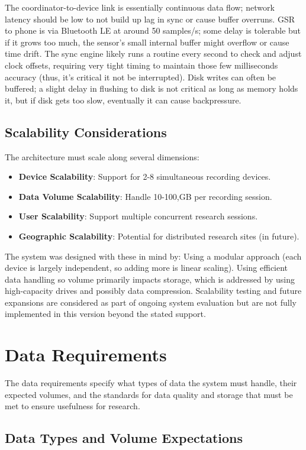\documentclass[11pt,a4paper]{report}
\begin{document}
The coordinator-to-device link is essentially continuous data flow; network latency should be low to not build up lag in sync or cause buffer overruns.
GSR to phone is via Bluetooth LE at around 50 samples/s; some delay is tolerable but if it grows too much, the sensor's small internal buffer might overflow or cause time drift.
The sync engine likely runs a routine every second to check and adjust clock offsets, requiring very tight timing to maintain those few milliseconds accuracy (thus, it's critical it not be interrupted).
Disk writes can often be buffered; a slight delay in flushing to disk is not critical as long as memory holds it, but if disk gets too slow, eventually it can cause backpressure.
\subsection{Scalability Considerations}
The architecture must scale along several dimensions:
\begin{itemize}
\item \textbf{Device Scalability}: Support for 2-8 simultaneous recording devices.
\item \textbf{Data Volume Scalability}: Handle 10-100,GB per recording session.
\item \textbf{User Scalability}: Support multiple concurrent research sessions.
\item \textbf{Geographic Scalability}: Potential for distributed research sites (in future).
\end{itemize} The system was designed with these in mind by:
Using a modular approach (each device is largely independent, so adding more is linear scaling).
Using efficient data handling so volume primarily impacts storage, which is addressed by using high-capacity drives and possibly data compression.
Scalability testing and future expansions are considered as part of ongoing system evaluation but are not fully implemented in this version beyond the stated support. \section{Data Requirements}
The data requirements specify what types of data the system must handle, their expected volumes, and the standards for data quality and storage that must be met to ensure usefulness for research. \subsection{Data Types and Volume Expectations}
\end{document}

